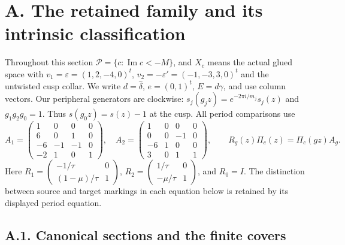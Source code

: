 \section{A. The retained family and its intrinsic classification}

Throughout this section $\mathcal P=\{c:\operatorname{Im}c<-M\}$, and $X_c$ means the actual glued space with $v_1=\varepsilon=(1,2,-4,0)^t$, $v_2=-\varepsilon'=(-1,-3,3,0)^t$ and the untwisted cusp collar. We write $d=\widehat\delta$, $e=(0,1)^t$, $E=d\gamma$, and use column vectors. Our peripheral generators are clockwise: $s_j(g_jz)=e^{-2\pi i/m_j}s_j(z)$ and $g_1g_2g_0=1$. Thus $s(g_0z)=s(z)-1$ at the cusp. All period comparisons use
\[
 A_1=\begin{pmatrix}1&0&0&0\\6&0&1&0\\-6&-1&-1&0\\-2&1&0&1\end{pmatrix},\quad
 A_2=\begin{pmatrix}1&0&0&0\\0&0&-1&0\\-6&1&0&0\\3&0&1&1\end{pmatrix},\qquad
 R_g(z)\Pi_c(z)=\Pi_c(gz)A_g.
\]
Here $R_1=\left(\begin{smallmatrix}-1/\tau&0\\(1-\mu)/\tau&1\end{smallmatrix}\right)$, $R_2=\left(\begin{smallmatrix}1/\tau&0\\-\mu/\tau&1\end{smallmatrix}\right)$, and $R_0=I$. The distinction between source and target markings in each equation below is retained by its displayed period equation.

\subsection{A.1. Canonical sections and the finite covers}

